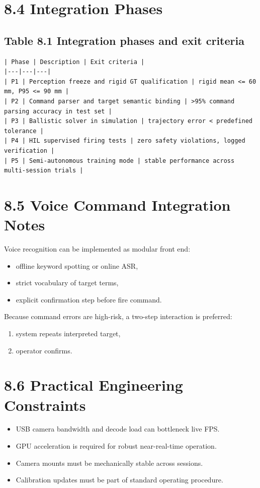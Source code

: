 \section{8.4 Integration Phases}
\subsection{Table 8.1 Integration phases and exit criteria}
\begin{verbatim}
| Phase | Description | Exit criteria |
|---|---|---|
| P1 | Perception freeze and rigid GT qualification | rigid mean <= 60 mm, P95 <= 90 mm |
| P2 | Command parser and target semantic binding | >95% command parsing accuracy in test set |
| P3 | Ballistic solver in simulation | trajectory error < predefined tolerance |
| P4 | HIL supervised firing tests | zero safety violations, logged verification |
| P5 | Semi-autonomous training mode | stable performance across multi-session trials |
\end{verbatim}

\section{8.5 Voice Command Integration Notes}
Voice recognition can be implemented as modular front end:
\begin{itemize}
  \item offline keyword spotting or online ASR,
  \item strict vocabulary of target terms,
  \item explicit confirmation step before fire command.
\end{itemize}

Because command errors are high-risk, a two-step interaction is preferred:
\begin{enumerate}
  \item system repeats interpreted target,
  \item operator confirms.
\end{enumerate}

\section{8.6 Practical Engineering Constraints}
\begin{itemize}
  \item USB camera bandwidth and decode load can bottleneck live FPS.
  \item GPU acceleration is required for robust near-real-time operation.
  \item Camera mounts must be mechanically stable across sessions.
  \item Calibration updates must be part of standard operating procedure.
\end{itemize}

